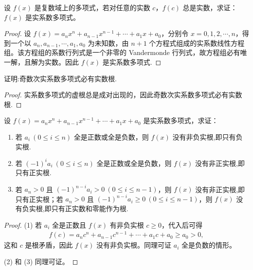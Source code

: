 \documentclass[../../main.tex]{subfiles}%
\begin{document}
\begin{proposition}\label{proposition:实系数多项式的判定条件}
设 $f(x)$ 是复数域上的多项式，若对任意的实数 $c$，$f(c)$ 总是实数，求证：$f(x)$ 是实系数多项式。
\end{proposition}
\begin{proof}

设 $f(x) = a_n x^n + a_{n-1} x^{n-1} + \cdots + a_1 x + a_0$，分别令 $x = 0, 1, 2, \cdots, n$，得到一个以 $a_n, a_{n-1}, \cdots, a_1, a_0$ 为未知数，由 $n + 1$ 个方程式组成的实系数线性方程组。该方程组的系数行列式是一个非零的 Vandermonde 行列式，故方程组必有唯一解，且解为实数。因此 $f(x)$ 是实系数多项式.

\end{proof}

\begin{example}
证明:奇数次实系数多项式必有实数根.
\end{example}
\begin{proof}

实系数多项式的虚根总是成对出现的，因此奇数次实系数多项式必有实数根.

\end{proof}

\begin{proposition}\label{proposition:实系数多项式的根的符号判定准则}
设 $f(x) = a_n x^n + a_{n-1} x^{n-1} + \cdots + a_1 x + a_0$ 是实系数多项式，求证：
\begin{enumerate}[(1)]
\item 若 $a_i \ (0 \leqslant  i \leqslant  n)$ 全是正数或全是负数，则 $f(x)$ 没有非负实根,即只有负实根.
\item 若 $(-1)^i a_i \ (0 \leqslant  i \leqslant  n)$ 全是正数或全是负数，则 $f(x)$ 没有非正实根,即只有正实根.
\item 若 $a_n > 0$ 且 $(-1)^{n-i} a_i > 0 \ (0 \leqslant  i \leqslant  n-1)$，则 $f(x)$ 没有非正实根,即只有正实根；若 $a_n > 0$ 且 $(-1)^{n-i} a_i \geqslant  0 \ (0 \leqslant  i \leqslant  n-1)$，则 $f(x)$ 没有负实根,即只有正实数和零能作为根.
\end{enumerate}
\end{proposition}
\begin{proof}

(1) 若 $a_i$ 全是正数且 $f(x)$ 有非负实根 $c \geqslant  0$，代入后可得
\begin{align*}
f(c) = a_n c^n + a_{n-1} c^{n-1} + \cdots + a_1 c + a_0 \geqslant  a_0 > 0,
\end{align*}
这和 $c$ 是根矛盾，因此 $f(x)$ 没有非负实根。同理可证 $a_i$ 全是负数的情形。

(2) 和 (3) 同理可证。

\end{proof}
\end{document}

